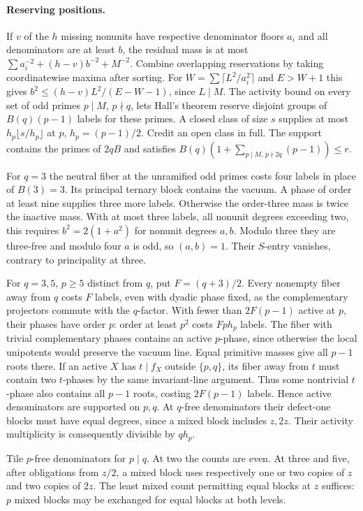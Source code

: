 \documentclass[11pt]{amsart}
\numberwithin{equation}{section}
\theoremstyle{definition}
\theoremstyle{plain}
\begin{document}
\paragraph{Reserving positions.}
If $v$ of the $h$ missing nonunits have respective denominator floors
$a_i$ and all denominators are at least $b$, the residual mass is at most
$\sum a_i^{-2}+(h-v)b^{-2}+M^{-2}$. Combine overlapping reservations
by taking coordinatewise maxima after sorting. For
$W=\sum\lceil L^2/a_i^2\rceil$ and $E>W+1$ this gives
$b^2\le(h-v)L^2/(E-W-1)$, since $L\mid M$. The activity bound on
every set of odd primes $p\mid M$, $p\nmid q$, lets Hall's theorem reserve
disjoint groups of $B(q)(p-1)$ labels for these primes. A closed class of
size $s$ supplies at most $h_p\lfloor s/h_p\rfloor$ at $p$,
$h_p=(p-1)/2$. Credit an open class in full. The support contains the
primes of $2qB$ and satisfies $B(q)(1+\sum_{p\mid M,\,p\nmid2q}(p-1))\le r$.

For $q=3$ the neutral fiber at the unramified odd primes costs four
labels in place of $B(3)=3$. Its principal ternary block contains the
vacuum. A phase of order at least nine supplies three more labels.
Otherwise the order-three mass is twice the inactive mass. With at most
three labels, all nonunit degrees exceeding two, this requires
$b^2=2(1+a^2)$ for nonunit degrees $a,b$. Modulo three they are
three-free and modulo four $a$ is odd, so $(a,b)=1$. Their $S$-entry
vanishes, contrary to principality at three.

For $q=3,5$, $p\ge5$ distinct from $q$, put $F=(q+3)/2$.
Every nonempty fiber away from $q$ costs $F$ labels, even with dyadic
phase fixed, as the complementary projectors commute with the $q$-factor.
With fewer than $2F(p-1)$ active at $p$, their phases have order $p$:
order at least $p^2$ costs $Fph_p$ labels. The fiber with trivial
complementary phases contains an active $p$-phase, since otherwise the
local unipotents would preserve the vacuum line. Equal primitive masses
give all $p-1$ roots there. If an active $X$ has $t\mid f_X$ outside
$\{p,q\}$, its fiber away from $t$ must contain two $t$-phases by the
same invariant-line argument. Thus some nontrivial $t$-phase also contains
all $p-1$ roots, costing $2F(p-1)$ labels. Hence active denominators are
supported on $p,q$. At $q$-free denominators their defect-one blocks must
have equal degrees, since a mixed block includes $z,2z$. Their activity
multiplicity is consequently divisible by $qh_p$.

Tile $p$-free denominators for $p\mid q$. At two the counts are even.
At three and five, after obligations from $z/2$, a mixed block uses
respectively one or two copies of $z$ and two copies of $2z$.
The least mixed count permitting equal blocks at $z$ suffices: $p$
mixed blocks may be exchanged for equal blocks at both levels.
\end{document}
